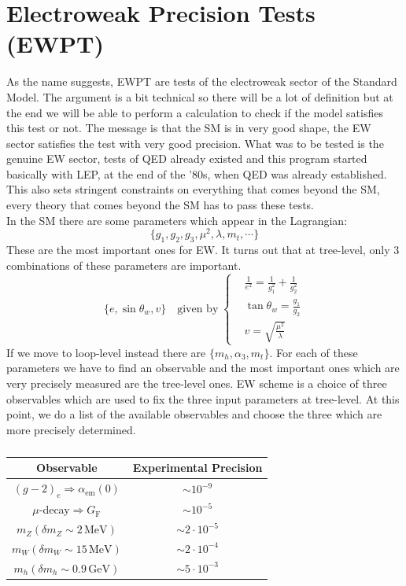 \documentclass[../main.tex]{subfiles}
\begin{document}
\section{Electroweak Precision Tests (EWPT)}
As the name suggests, EWPT are tests of the electroweak sector of the Standard Model. The argument is a bit technical so there will be a lot of definition but at the end we will be able to perform a calculation to check if the model satisfies this test or not. The message is that the SM is in very good shape, the EW sector satisfies the test with very good precision. What was to be tested is the genuine EW sector, tests of QED already existed and this program started basically with LEP, at the end of the '80s, when QED was already established. This also sets stringent constraints on everything that comes beyond the SM, every theory that comes beyond the SM has to pass these tests.\\
In the SM there are some parameters which appear in the Lagrangian:
\[
\{g_1, g_2, g_3, \mu^2, \lambda, m_t,\cdots\}
\]
These are the most important ones for EW. It turns out that at tree-level, only 3 combinations of these parameters are important.
\[
\{e,\sin\theta_w,v\} \quad \text{given by}\; \left\{
\begin{aligned}
&\frac{1}{e^2}=\frac{1}{g_1^2}+\frac{1}{g_2^2}\\
&\tan\theta_w=\frac{g_1}{g_2}\\
&v=\sqrt{\frac{\mu^2}{\lambda}}
\end{aligned}
\right.
\]
If we move to loop-level instead there are $\{m_h, \alpha_3, m_t\}$. For each of these parameters we have to find an observable and the most important ones which are very precisely measured are the tree-level ones. EW scheme is a choice of three observables which are used to fix the three input parameters at tree-level. At this point, we do a list of the available observables and choose the three which are more precisely determined.
\begin{table}[h]
    \centering
    \begin{tabular}{c|c}
    \hline
    \rowcolor{gray!45} Observable & Experimental Precision\\
    \hline
    $(g-2)_e\Rightarrow\alpha_{\text{em}}(0)$ & $\sim10^{-9}$\\
    $\mu$-decay$\Rightarrow G_{\text{F}}$ & $\sim10^{-5}$\\
    $m_Z(\delta m_Z\sim2\,\text{MeV})$ & $\sim2\cdot10^{-5}$\\
    $m_W(\delta m_W\sim15\,\text{MeV})$ & $\sim2\cdot10^{-4}$\\
    $m_h(\delta m_h\sim0.9\,\text{GeV})$ & $\sim5\cdot10^{-3}$\\
    \hline
    \end{tabular}
    \caption*{}
\end{table}
\end{document}
